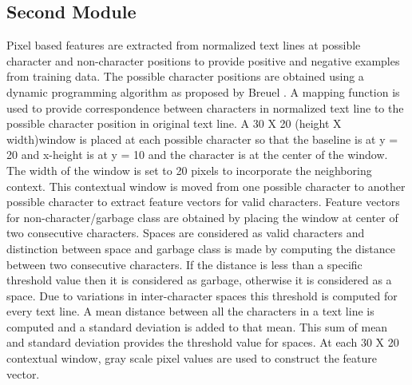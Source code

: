 \subsection{Second Module}
Pixel based features are extracted from normalized text lines at possible character and non-character positions to provide positive and negative examples from training data. The possible character positions are obtained using a dynamic programming algorithm as proposed by Breuel . A mapping function is used to provide correspondence between characters in normalized text line to the possible character position in original text line. A 30 X 20 (height X width)window is placed at each possible character so that the baseline is at y = 20 and x-height is at y = 10 and the character is at the center of the window. The width of the window is set to 20 pixels to incorporate the neighboring context. This contextual window is moved from one possible character to another possible character to extract feature vectors for valid characters. Feature vectors for non-character/garbage class are obtained by placing the window at center of two consecutive characters. Spaces are considered as valid characters and distinction between space and garbage class is made by computing the distance between two consecutive characters. If the distance is less than a speciﬁc threshold value then it is considered as garbage, otherwise it is considered as a space. Due to variations in inter-character spaces this threshold is computed for every text line. A mean distance between all the characters in a text line is computed and a standard deviation is added to that mean. This sum of mean and standard deviation provides the threshold value for spaces. At each 30 X 20 contextual window, gray scale pixel values are used to construct the feature vector.\\

